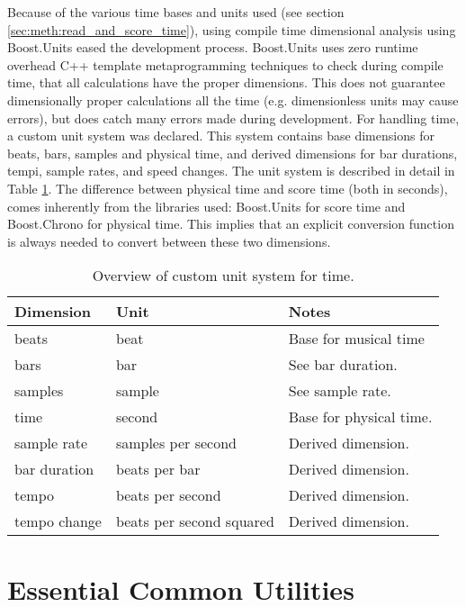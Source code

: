 Because of the various time bases and units used
(see section \ref{sec:meth:read_and_score_time}),
using compile time dimensional analysis using Boost.Units \cite{needed?}
eased the development process.
Boost.Units uses zero runtime overhead C++ template metaprogramming \cite{abrahams?}
techniques to check during compile time,
that all calculations have the proper dimensions.
This does not guarantee dimensionally proper calculations all the time
(e.g. dimensionless units may cause errors),
but does catch many errors made during development.
For handling time,
a custom unit system was declared.
This system contains base dimensions for
beats, bars, samples and physical time,
and derived dimensions for
bar durations, tempi, sample rates, and speed changes.
The unit system is described in detail in Table \ref{tab:score_units}.
The difference between physical time and score time (both in seconds),
comes inherently from the libraries used:
Boost.Units for score time and Boost.Chrono for physical time.
This implies that an explicit conversion function is always
needed to convert between these two dimensions.

\begin{table}
\begin{center}
\begin{tabular}{ l  l  l }
\toprule
Dimension & Unit & Notes \\
\midrule
beats & beat & Base for musical time \\
bars & bar & See bar duration. \\
samples & sample & See sample rate.\\
time & second & Base for physical time. \\
sample rate & samples per second & Derived dimension. \\
bar duration & beats per bar & Derived dimension. \\
tempo & beats per second & Derived dimension. \\
tempo change & beats per second squared & Derived dimension. \\
\bottomrule
\end{tabular}
\caption{Overview of custom unit system for time.}
\label{tab:score_units}
\end{center}
\end{table}

\section{Essential Common Utilities}

